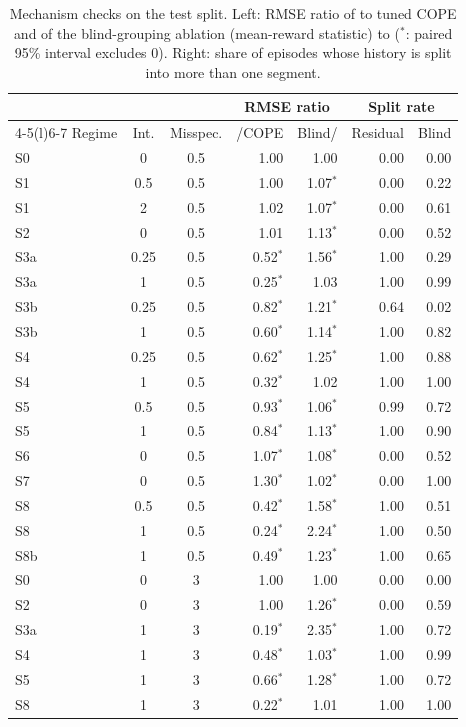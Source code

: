 \begin{table}[t]\centering\scriptsize
\caption{Mechanism checks on the test split. Left: RMSE ratio of \odrift{} to tuned COPE and of the blind-grouping ablation (mean-reward statistic) to \odrift{} ($^{*}$: paired 95\% interval excludes 0). Right: share of episodes whose history is split into more than one segment.}
\label{tab:novelty}
\begin{tabular}{@{}lccrrrr@{}}\toprule
 & & & \multicolumn{2}{c}{RMSE ratio} & \multicolumn{2}{c}{Split rate} \\\cmidrule(lr){4-5}\cmidrule(l){6-7}
Regime & Int. & Misspec. & \odrift{}/COPE & Blind/\odrift{} & Residual & Blind \\\midrule
S0 & 0 & 0.5 & 1.00 & 1.00 & 0.00 & 0.00 \\
S1 & 0.5 & 0.5 & 1.00 & 1.07$^{*}$ & 0.00 & 0.22 \\
S1 & 2 & 0.5 & 1.02 & 1.07$^{*}$ & 0.00 & 0.61 \\
S2 & 0 & 0.5 & 1.01 & 1.13$^{*}$ & 0.00 & 0.52 \\
S3a & 0.25 & 0.5 & 0.52$^{*}$ & 1.56$^{*}$ & 1.00 & 0.29 \\
S3a & 1 & 0.5 & 0.25$^{*}$ & 1.03 & 1.00 & 0.99 \\
S3b & 0.25 & 0.5 & 0.82$^{*}$ & 1.21$^{*}$ & 0.64 & 0.02 \\
S3b & 1 & 0.5 & 0.60$^{*}$ & 1.14$^{*}$ & 1.00 & 0.82 \\
S4 & 0.25 & 0.5 & 0.62$^{*}$ & 1.25$^{*}$ & 1.00 & 0.88 \\
S4 & 1 & 0.5 & 0.32$^{*}$ & 1.02 & 1.00 & 1.00 \\
S5 & 0.5 & 0.5 & 0.93$^{*}$ & 1.06$^{*}$ & 0.99 & 0.72 \\
S5 & 1 & 0.5 & 0.84$^{*}$ & 1.13$^{*}$ & 1.00 & 0.90 \\
S6 & 0 & 0.5 & 1.07$^{*}$ & 1.08$^{*}$ & 0.00 & 0.52 \\
S7 & 0 & 0.5 & 1.30$^{*}$ & 1.02$^{*}$ & 0.00 & 1.00 \\
S8 & 0.5 & 0.5 & 0.42$^{*}$ & 1.58$^{*}$ & 1.00 & 0.51 \\
S8 & 1 & 0.5 & 0.24$^{*}$ & 2.24$^{*}$ & 1.00 & 0.50 \\
S8b & 1 & 0.5 & 0.49$^{*}$ & 1.23$^{*}$ & 1.00 & 0.65 \\
S0 & 0 & 3 & 1.00 & 1.00 & 0.00 & 0.00 \\
S2 & 0 & 3 & 1.00 & 1.26$^{*}$ & 0.00 & 0.59 \\
S3a & 1 & 3 & 0.19$^{*}$ & 2.35$^{*}$ & 1.00 & 0.72 \\
S4 & 1 & 3 & 0.48$^{*}$ & 1.03$^{*}$ & 1.00 & 0.99 \\
S5 & 1 & 3 & 0.66$^{*}$ & 1.28$^{*}$ & 1.00 & 0.72 \\
S8 & 1 & 3 & 0.22$^{*}$ & 1.01 & 1.00 & 1.00 \\
\bottomrule\end{tabular}\end{table}
